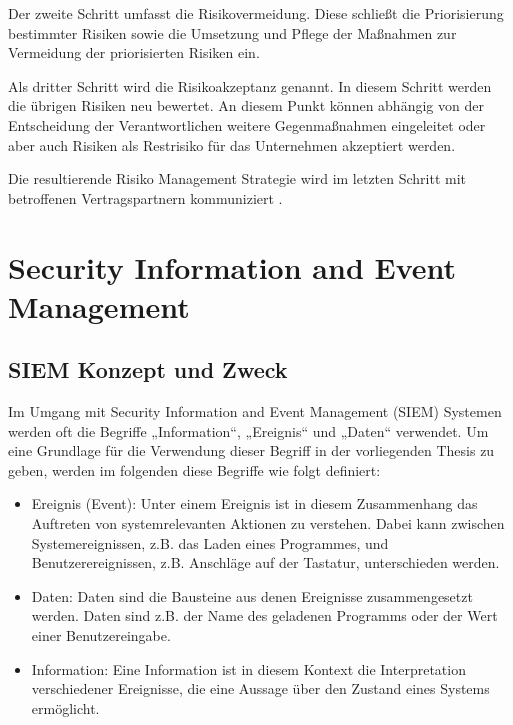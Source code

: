 Der zweite Schritt umfasst die Risikovermeidung. Diese schließt die Priorisierung bestimmter Risiken sowie die Umsetzung und Pflege der Maßnahmen zur Vermeidung der priorisierten Risiken ein. 

Als dritter Schritt wird die Risikoakzeptanz genannt. In diesem Schritt werden die übrigen Risiken neu bewertet. An diesem Punkt können abhängig von der Entscheidung der Verantwortlichen weitere Gegenmaßnahmen eingeleitet oder aber auch Risiken als Restrisiko für das Unternehmen akzeptiert werden. 

Die resultierende Risiko Management Strategie wird im letzten Schritt mit betroffenen Vertragspartnern kommuniziert \citep{Partida2010}.

\section{Security Information and Event Management}
\label{cha:Security Information and Event Management}

\subsection{SIEM Konzept und Zweck}
\label{cha::SIEM Konzept und Zweck}
Im Umgang mit Security Information and Event Management (SIEM) Systemen werden oft die Begriffe „Information“, „Ereignis“ und „Daten“ verwendet. Um eine Grundlage für die Verwendung dieser Begriff in der vorliegenden Thesis zu geben, werden im folgenden diese Begriffe wie folgt definiert:
\begin{itemize}
\item Ereignis (Event): Unter einem Ereignis ist in diesem Zusammenhang das Auftreten von systemrelevanten Aktionen zu verstehen. Dabei kann zwischen Systemereignissen, z.B. das Laden eines Programmes, und Benutzerereignissen, z.B. Anschläge auf der Tastatur, unterschieden werden. 
\item Daten: Daten sind die Bausteine aus denen Ereignisse zusammengesetzt werden. Daten sind z.B. der Name des geladenen Programms oder der Wert einer Benutzereingabe.
\item Information: Eine Information ist in diesem Kontext die Interpretation verschiedener Ereignisse, die eine Aussage über den Zustand eines Systems ermöglicht.
\end{itemize}


